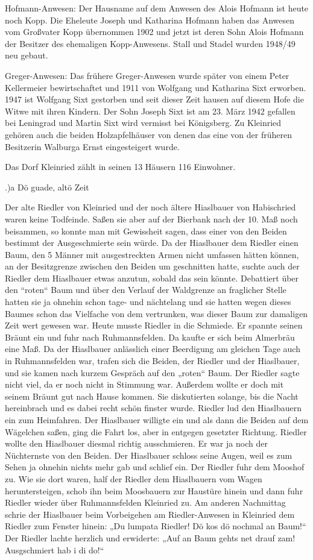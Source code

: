 \documentclass{book}
\begin{document}
Hofmann-Anwesen: Der Hausname auf dem Anwesen des Alois Hofmann ist heute noch
Kopp. Die Eheleute Joseph und Katharina Hofmann haben das Anwesen vom Großvater
Kopp übernommen 1902 und jetzt ist deren Sohn Alois Hofmann der Besitzer des
ehemaligen Kopp-Anwesens. Stall und Stadel wurden 1948/49 neu gebaut.

Greger-Anwesen: Das frühere Greger-Anwesen wurde später von einem Peter
Kellermeier bewirtschaftet und 1911 von Wolfgang und Katharina Sixt erworben.
1947 ist Wolfgang Sixt gestorben und seit dieser Zeit hausen auf diesem Hofe die
Witwe mit ihren Kindern. Der Sohn Joseph Sixt ist am 23. März 1942 gefallen bei
Leningrad und Martin Sixt wird vermisst bei Königsberg. Zu Kleinried gehören
auch die beiden Holzapfelhäuser von denen das eine von der früheren Besitzerin
Walburga Ernst eingesteigert wurde.

Das Dorf Kleinried zählt in seinen 13 Häusern 116 Einwohner.

.)a Dö guade, altö Zeit

Der alte Riedler von Kleinried und der noch ältere Hiaslbauer von Habischried
waren keine Todfeinde. Saßen sie aber auf der Bierbank nach der 10. Maß noch
beisammen, so konnte man mit Gewissheit sagen, dass einer von den Beiden
bestimmt der Ausgeschmierte sein würde. Da der Hiaslbauer dem Riedler einen
Baum, den 5 Männer mit ausgestreckten Armen nicht umfassen hätten können, an der
Besitzgrenze zwischen den Beiden um geschnitten hatte, suchte auch der Riedler
dem Hiaslbauer etwas anzutun, sobald das sein könnte. Debattiert über den
“roten“ Baum und über den Verlauf der Waldgrenze an fraglicher Stelle hatten sie
ja ohnehin schon tage- und nächtelang und sie hatten wegen dieses Baumes schon
das Vielfache von dem vertrunken, was dieser Baum zur damaligen Zeit wert
gewesen war. Heute musste Riedler in die Schmiede. Er spannte seinen Bräunt ein
und fuhr nach Ruhmannsfelden. Da kaufte er sich beim Almerbräu eine Maß. Da der
Hiaslbauer anlässlich einer Beerdigung am gleichen Tage auch in Ruhmannsfelden
war, trafen sich die Beiden, der Riedler und der Hiaslbauer, und sie kamen nach
kurzem Gespräch auf den „roten“ Baum. Der Riedler sagte nicht viel, da er noch
nicht in Stimmung war. Außerdem wollte er doch mit seinem Bräunt gut nach Hause
kommen. Sie diskutierten solange, bis die Nacht hereinbrach und es dabei recht
schön finster wurde. Riedler lud den Hiaslbauern ein zum Heimfahren. Der
Hiaslbauer willigte ein und als dann die Beiden auf dem Wägelchen saßen, ging
die Fahrt los, aber in entgegen gesetzter Richtung. Riedler wollte den
Hiaslbauer diesmal richtig ausschmieren. Er war ja noch der Nüchternste von den
Beiden. Der Hiaslbauer schloss seine Augen, weil es zum Sehen ja ohnehin nichts
mehr gab und schlief ein. Der Riedler fuhr dem Mooshof zu. Wie sie dort waren,
half der Riedler dem Hiaslbauern vom Wagen heruntersteigen, schob ihn beim
Moosbauern zur Haustüre hinein und dann fuhr Riedler wieder über Ruhmannsfelden
Kleinried zu. Am anderen Nachmittag schrie der Hiaslbauer beim Vorbeigehen am
Riedler-Anwesen in Kleinried dem Riedler zum Fenster hinein: „Du lumpata
Riedler! Dö kos dö nochmal an Baum!“ Der Riedler lachte herzlich und erwiderte:
„Auf an Baum gehts net drauf zam! Ausgschmiert hab i di do!“
\end{document}
